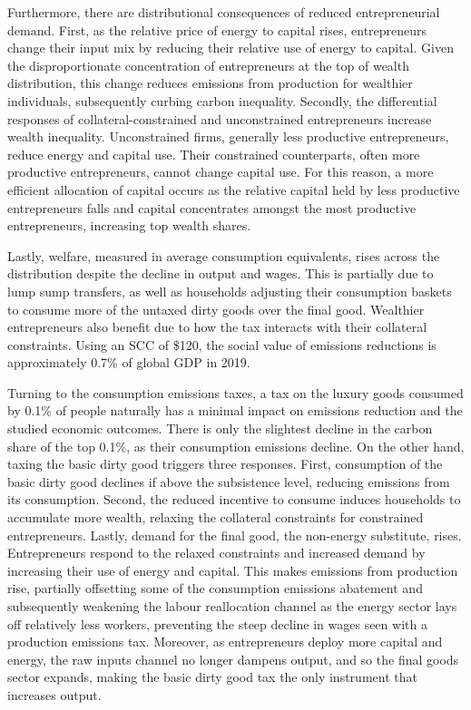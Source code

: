 \documentclass[12pt,a4paper]{article}
\begin{document}
\hspace*{6mm} Furthermore, there are distributional consequences of reduced entrepreneurial demand. First, as the relative price of energy to capital rises, entrepreneurs change their input mix by reducing their relative use of energy to capital. Given the disproportionate concentration of entrepreneurs at the top of wealth distribution, this change reduces emissions from production for wealthier individuals, subsequently curbing carbon inequality. Secondly, the differential responses of collateral-constrained and unconstrained entrepreneurs increase wealth inequality. Unconstrained firms, generally less productive entrepreneurs, reduce energy and capital use. Their constrained counterparts, often more productive entrepreneurs, cannot change capital use. For this reason, a more efficient allocation of capital occurs as the relative capital held by less productive entrepreneurs falls and capital concentrates amongst the most productive entrepreneurs, increasing top wealth shares. 

\hspace*{6mm} Lastly, welfare, measured in average consumption equivalents, rises across the distribution despite the decline in output and wages. This is partially due to lump sump transfers, as well as households adjusting their consumption baskets to consume more of the untaxed dirty goods over the final good. Wealthier entrepreneurs also benefit due to how the tax interacts with their collateral constraints. Using an SCC of \$120, the social value of emissions reductions is approximately 0.7\% of global GDP in 2019.

\hspace*{6mm} Turning to the consumption emissions taxes, a tax on the luxury goods consumed by 0.1\% of people naturally has a minimal impact on emissions reduction and the studied economic outcomes. There is only the slightest decline in the carbon share of the top 0.1\%, as their consumption emissions decline. On the other hand, taxing the basic dirty good triggers three responses. First, consumption of the basic dirty good declines if above the subsistence level, reducing emissions from its consumption. Second, the reduced incentive to consume induces households to accumulate more wealth, relaxing the collateral constraints for constrained entrepreneurs. Lastly, demand for the final good, the non-energy substitute, rises. Entrepreneurs respond to the relaxed constraints and increased demand by increasing their use of energy and capital. This makes emissions from production rise, partially offsetting some of the consumption emissions abatement and subsequently weakening the labour reallocation channel as the energy sector lays off relatively less workers, preventing the steep decline in wages seen with a production emissions tax. Moreover, as entrepreneurs deploy more capital and energy, the raw inputs channel no longer dampens output, and so the final goods sector expands, making the basic dirty good tax the only instrument that increases output. 
\end{document}
